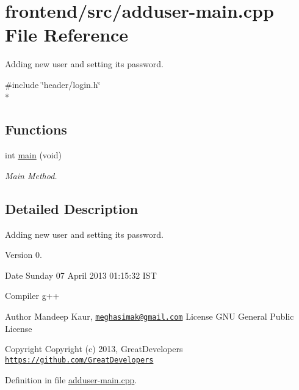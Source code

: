 \hypertarget{adduser-main_8cpp}{\section{frontend/src/adduser-\/main.cpp File Reference}
\label{adduser-main_8cpp}
}


Adding new user and setting its password.  


{\ttfamily \#include \char`\"{}header/login.\-h\char`\"{}}\\*
\subsection*{Functions}
\begin{DoxyCompactItemize}
\item 
int \hyperlink{adduser-main_8cpp_a568b3afc214ba30be5bf526d6b27b611}{main} (void)
\begin{DoxyCompactList}\small\item\em Main Method. \end{DoxyCompactList}\end{DoxyCompactItemize}


\subsection{Detailed Description}
Adding new user and setting its password. \begin{DoxyVersion}{Version}
0. 
\end{DoxyVersion}
\begin{DoxyDate}{Date}
Sunday 07 April 2013 01\-:15\-:32 I\-S\-T\par
 Compiler g++
\end{DoxyDate}
\begin{DoxyAuthor}{Author}
Mandeep Kaur, \href{mailto:meghasimak@gmail.com}{\tt meghasimak@gmail.\-com} License G\-N\-U General Public License 
\end{DoxyAuthor}
\begin{DoxyCopyright}{Copyright}
Copyright (c) 2013, Great\-Developers \href{https://github.com/GreatDevelopers}{\tt https\-://github.\-com/\-Great\-Developers} 
\end{DoxyCopyright}


Definition in file \hyperlink{adduser-main_8cpp_source}{adduser-\/main.\-cpp}.



